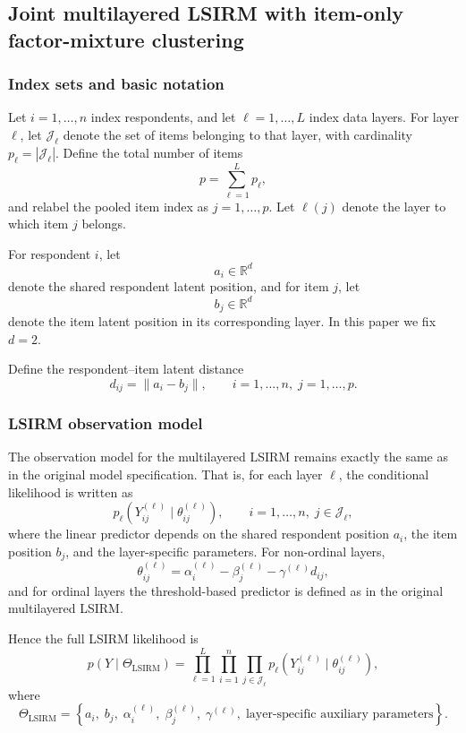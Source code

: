 \subsection{Joint multilayered LSIRM with item-only factor-mixture clustering}

\subsubsection{Index sets and basic notation}

Let $i=1,\dots,n$ index respondents, and let $\ell=1,\dots,L$ index data layers.
For layer $\ell$, let $\mathcal{J}_\ell$ denote the set of items belonging to that layer,
with cardinality $p_\ell = |\mathcal{J}_\ell|$.
Define the total number of items
\[
p = \sum_{\ell=1}^L p_\ell,
\]
and relabel the pooled item index as $j=1,\dots,p$.
Let $\ell(j)$ denote the layer to which item $j$ belongs.

For respondent $i$, let
\[
a_i \in \mathbb{R}^d
\]
denote the shared respondent latent position, and for item $j$, let
\[
b_j \in \mathbb{R}^d
\]
denote the item latent position in its corresponding layer.
In this paper we fix $d=2$.

Define the respondent--item latent distance
\[
d_{ij} = \|a_i - b_j\|, \qquad i=1,\dots,n,\; j=1,\dots,p.
\]

\subsubsection{LSIRM observation model}

The observation model for the multilayered LSIRM remains exactly the same as in the original
model specification.
That is, for each layer $\ell$, the conditional likelihood is written as
\[
p_\ell\!\left(Y_{ij}^{(\ell)} \mid \theta_{ij}^{(\ell)}\right),
\qquad
i=1,\dots,n,\; j\in\mathcal{J}_\ell,
\]
where the linear predictor depends on the shared respondent position $a_i$, the
item position $b_j$, and the layer-specific parameters.
For non-ordinal layers,
\[
\theta_{ij}^{(\ell)}
=
\alpha_i^{(\ell)} - \beta_j^{(\ell)} - \gamma^{(\ell)} d_{ij},
\]
and for ordinal layers the threshold-based predictor is defined as in the original multilayered LSIRM.

Hence the full LSIRM likelihood is
\[
p(Y \mid \Theta_{\mathrm{LSIRM}})
=
\prod_{\ell=1}^L \prod_{i=1}^n \prod_{j\in\mathcal{J}_\ell}
p_\ell\!\left(Y_{ij}^{(\ell)} \mid \theta_{ij}^{(\ell)}\right),
\]
where
\[
\Theta_{\mathrm{LSIRM}}
=
\left\{
a_i,\; b_j,\; \alpha_i^{(\ell)},\; \beta_j^{(\ell)},\; \gamma^{(\ell)},\;
\text{layer-specific auxiliary parameters}
\right\}.
\]

